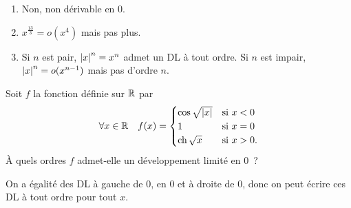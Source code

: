 \documentclass{magnolia}
\begin{document}
\begin{sol}
\begin{enumerate}
\item Non, non dérivable en $0$.
\item  $x^{\frac{13}{3}} = o(x^4)$ mais pas plus.
\item Si $n$ est pair, $\left|x\right|^n = x^n$ admet un DL à tout ordre.
  Si $n$ est impair, $\left|x\right|^n =o(x^{n-1})$ mais pas d'ordre $n$.
\end{enumerate}
\end{sol}


Soit $f$ la fonction définie sur $\mathbb{R}$ par
\[\forall x\in\mathbb{R} \quad f(x)=
  \begin{cases}
  \cos\sqrt{\left|x\right|} & \text{si $x<0$}\\
  1 & \text{si $x=0$}\\  
  \operatorname{ch}\sqrt{x} & \text{si $x>0$.}
  \end{cases}\]
À quels ordres $f$ admet-elle un développement limité en $0$~?

\begin{sol}
On a égalité des DL à gauche de $0$, en $0$ et à droite de $0$, donc on peut écrire ces DL à tout ordre pour tout $x$.
\end{sol}

\end{document}
